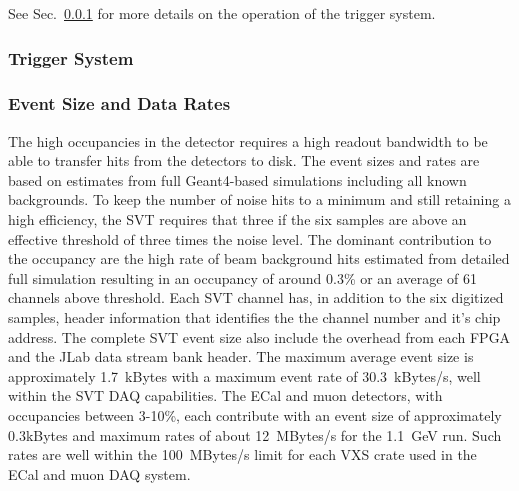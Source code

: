 See Sec.~\ref{sec:triggerdaq} for more details on the operation of the trigger system.


\subsubsection{Trigger System}
\label{sec:triggerdaq}


\subsubsection{Event Size and Data Rates}

The high occupancies in the detector requires a high readout bandwidth to be able to transfer hits from the 
detectors to disk. The event sizes and rates are based on estimates from full Geant4-based simulations 
including all known backgrounds. 
To keep the number of noise hits to a minimum and still retaining a high efficiency, 
the SVT requires that three if the six samples are above an effective threshold of three times the noise 
level. The dominant contribution to the occupancy are the high rate of beam background hits estimated 
from detailed full simulation resulting in an occupancy of around 0.3\% or an average of 61 channels above threshold.  
Each SVT channel has, in addition to the six digitized samples,  header information that identifies the 
the channel number and it's chip address. The complete SVT event size also 
include the overhead from each FPGA and the JLab data stream bank header.  
The maximum average event size is approximately 1.7~kBytes with a maximum event rate 
of 30.3~kBytes/s, well within the SVT DAQ capabilities. 
The ECal and muon detectors, with occupancies between 3-10\%, each contribute with an event size of 
approximately 0.3kBytes and maximum rates of about 12~MBytes/s for the 1.1~GeV run. 
 Such rates are well within the 100~MBytes/s limit for each VXS crate used in the ECal and muon 
DAQ system.
